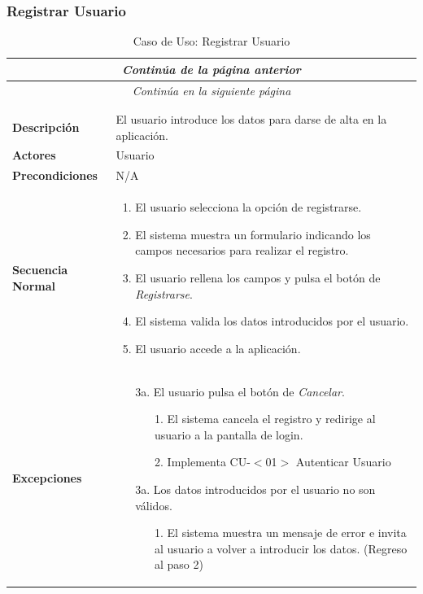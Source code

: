 \newpage
\subsubsection*{Registrar Usuario}
\begin{longtable}{| p{4cm} | p{10cm} |}
\endfirsthead
\multicolumn{2}{c}{\textit{Continúa de la página anterior}}\\[12pt]
\hline
\endhead
\hline
\multicolumn{2}{c}{\textit{Continúa en la siguiente página}} \\
\endfoot
\hline
\caption{Caso de Uso: Registrar Usuario}\label{fig:1}\\
\endlastfoot


\hline
\multicolumn{2}{|c|}{\textbf{CU$<$02$>$ Registrar Usuario}} \\

\hline
\textbf{Descripción} &
El usuario introduce los datos para darse de alta en la aplicación. \\

\hline
\textbf{Actores} &
Usuario\\


\hline
\textbf{Precondiciones} &
N/A\\

\hline
\textbf{Secuencia Normal} &\mbox{}\par\vspace{-\baselineskip}
\begin{enumerate}[leftmargin=0.7cm, topsep=0.1cm]
\item El usuario selecciona la opción de registrarse.
\item El sistema muestra un formulario indicando los campos necesarios para realizar el registro.
\item El usuario rellena los campos y pulsa el botón de \textit{Registrarse}.
\item El sistema valida los datos introducidos por el usuario.
\item El usuario accede a la aplicación.
\end{enumerate}\\

\hline
\textbf{Excepciones} &\mbox{}\par\vspace{-\baselineskip}
\begin{enumerate}[leftmargin=0.9cm, topsep=0.1cm]
\item[3a.] El usuario pulsa el botón de \textit{Cancelar}.
	\begin{itemize}
	\item[1.] El sistema cancela el registro y redirige al usuario a la pantalla de login.
	\item[2.] Implementa CU-$<$01$>$ Autenticar Usuario
	\end{itemize}
\item[3a.] Los datos introducidos por el usuario no son válidos.
	\begin{itemize}
	\item[1.] El sistema muestra un mensaje de error e invita al usuario a volver a introducir los datos. (Regreso al paso 2)
	\end{itemize}


\end{enumerate}
\end{longtable}
